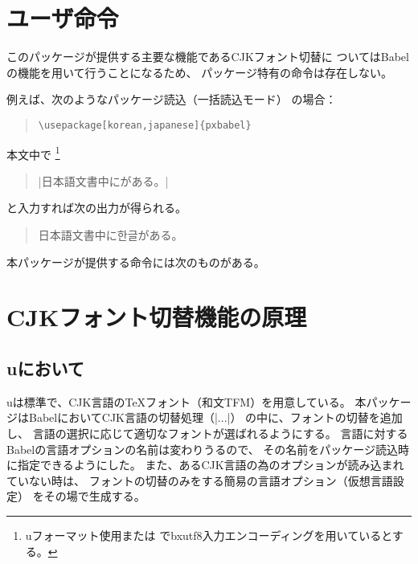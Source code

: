 \documentclass[a4paper,uplatex]{jsarticle}
\newcommand{\Pkg}[1]{\textsf{#1}}
\newcommand{\Meta}[1]{$\langle$\mbox{}#1\mbox{}$\rangle$}
\newcommand{\Means}{~：\quad}
\providecommand{\upTeX}{u\pTeX}
\providecommand{\upLaTeX}{u\pLaTeX}
\newcommand{\Kor}[1]{{\kanjishape{ko}\selectfont #1}}
\begin{document}
\section{ユーザ命令}

このパッケージが提供する主要な機能であるCJKフォント切替に
ついてはBabelの機能を用いて行うことになるため、
パッケージ特有の命令は存在しない。

例えば、次のようなパッケージ読込（一括読込モード）
の場合：
\begin{quote}\begin{verbatim}
\usepackage[korean,japanese]{pxbabel}
\end{verbatim}\end{quote}
本文中で
\footnote{{\upLaTeX}フォーマット使用または
{\pLaTeX}で\Pkg{bxutf8}入力エンコーディングを用いているとする。}
\begin{quote}
|日本語文書中に\foregnlanguage{korean}{|%
\textgt{\Kor{한글}}|}がある。|
\end{quote} 
と入力すれば次の出力が得られる。
\begin{quote}
日本語文書中に\Kor{한글}がある。
\end{quote} 

本パッケージが提供する命令には次のものがある。

\begin{itemize}
\item |\cjklanguagename{|\Meta{CJK言語識別子}|\Means
そのCJK言語に対する言語名。
\end{itemize}

\section{CJKフォント切替機能の原理}

\subsection{{\upLaTeX}において}

{\upTeX}は標準で、CJK言語の{\TeX}フォント（和文TFM）を用意している。
本パッケージはBabelにおいてCJK言語の切替処理（|\extras...|）
の中に、フォントの切替を追加し、
言語の選択に応じて適切なフォントが選ばれるようにする。
言語に対するBabelの言語オプションの名前は変わりうるので、
その名前をパッケージ読込時に指定できるようにした。
また、あるCJK言語の為のオプションが読み込まれていない時は、
フォントの切替のみをする簡易の言語オプション（仮想言語設定）
をその場で生成する。
\end{document}

